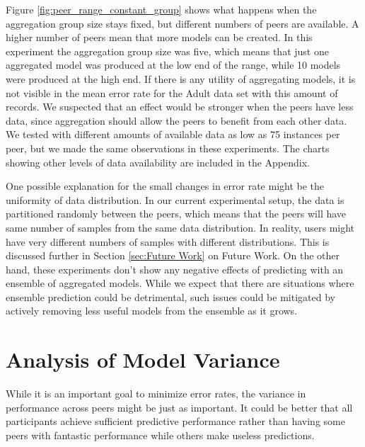 Figure \ref{fig:peer_range_constant_group} shows what happens when the aggregation group size stays fixed, but different numbers of peers are available. A higher number of peers mean that more models can be created. In this experiment the aggregation group size was five, which means that just one aggregated model was produced at the low end of the range, while 10 models were produced at the high end. If there is any utility of aggregating models, it is not visible in the mean error rate for the Adult data set with this amount of records. We suspected that an effect would be stronger when the peers have less data, since aggregation should allow the peers to benefit from each other data. We tested with different amounts of available data as low as 75 instances per peer, but we made the same observations in these experiments. The charts showing other levels of data availability are included in the Appendix. 

One possible explanation for the small changes in error rate might be the uniformity of data distribution. In our current experimental setup, the data is partitioned randomly between the peers, which means that the peers will have same number of samples from the same data distribution. In reality, users might have very different numbers of samples with different distributions. This is discussed further in Section \ref{sec:Future Work} on Future Work. On the other hand, these experiments don't show any negative effects of predicting with an ensemble of aggregated models. While we expect that there are situations where ensemble prediction could be detrimental, such issues could be mitigated by actively removing less useful models from the ensemble as it grows.

\section{Analysis of Model Variance}

While it is an important goal to minimize error rates, the variance in performance across peers might be just as important. It could be better that all participants achieve sufficient predictive performance rather than having some peers with fantastic performance while others make useless predictions.
 

